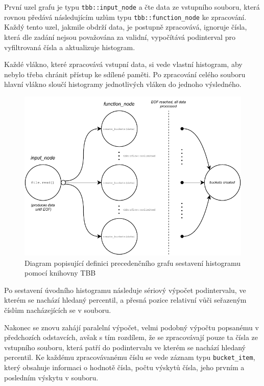 \documentclass[12pt, a4paper]{article}
\begin{document}
První uzel grafu je typu \texttt{tbb::input\_node} a čte data ze vstupního souboru, která rovnou předává následujícím uzlům typu \texttt{tbb::function\_node} ke zpracování.
Každý tento uzel, jakmile obdrží data, je postupně zpracovává, ignoruje čísla, která dle zadání nejsou považována za validní, vypočítává podinterval pro vyfiltrovaná čísla a aktualizuje histogram. 

Každé vlákno, které zpracovává vstupní data, si vede vlastní histogram, aby nebylo třeba chránit přístup ke sdílené paměti.
Po zpracování celého souboru hlavní vlákno sloučí histogramy jednotlivých vláken do jednoho výsledného.

\begin{figure}[!ht]
    \centering 
    \includegraphics[width=1.0\textwidth]{pdf/create-buckets-tbb.pdf}
    \caption{Diagram popisující definici precedenčního grafu sestavení histogramu pomocí knihovny TBB}
\end{figure}

Po sestavení úvodního histogramu následuje sériový výpočet podintervalu, ve kterém se nachází hledaný percentil, a přesná pozice relativní vůči seřazeným číslům nacházejících se v souboru.

Nakonec se znovu zahájí paralelní výpočet, velmi podobný výpočtu popsanému v předchozích odstavcích, avšak s tím rozdílem, že se zpracovávají pouze ta čísla ze vstupního souboru, která patří do podintervalu ve kterém se nachází hledaný percentil.
Ke každému zpracovávanému číslu se vede záznam typu \texttt{bucket\_item}, který obsahuje informaci o hodnotě čísla, počtu výskytů čísla, jeho prvním a posledním výskytu v souboru.
\end{document}
